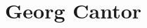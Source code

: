 \documentclass[../../../include/open-logic-chapter]{subfiles}
\begin{document}
\chapter{Georg Cantor}


\OLEndChapterHook
\end{document}
